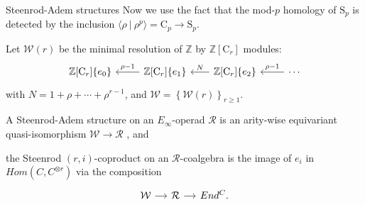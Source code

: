 \documentclass[10pt,t]{beamer}
\renewcommand{\S}{\mathrm{S}}
\newcommand{\C}{\mathrm{C}}
\begin{document}
\begin{frame}[fragile]{Steenrod-Adem structures}
	Now we use the fact that the mod-$p$ homology of $\S_p$ is detected by the inclusion $\langle \rho\ |\ \rho^p\rangle = \C_p \to \S_p$.
	
	\pause \vspace*{10pt}
	
	Let $\mathcal W(r)$ be the minimal resolution of $\mathbb{Z}$ by $\mathbb{Z}[\C_r]$ modules:
	\begin{equation*}
	\begin{tikzcd}[column sep=normal]
	\mathbb{Z}[\C_r]\{e_0\} & \arrow[l, "\rho-1"'] \mathbb{Z}[\C_r]\{e_1\} &[-5pt] \arrow[l, "N"']
	\mathbb{Z}[\C_r]\{e_2\} & \arrow[l, "\rho-1"'] \cdots
	\end{tikzcd}
	\end{equation*}
	with $N = 1+\rho+\cdots+\rho^{r-1}$, and $\mathcal{W} = \left\{\mathcal{W}(r)\right\}_{r \geq 1}$.
	
	\pause \vspace*{10pt}
	
	A \textcolor{pblue}{Steenrod-Adem structure} on an $E_\infty$-operad $\mathcal R$ is an arity-wise equivariant quasi-isomorphism $\mathcal W \to \mathcal R$ \pause, and
	
	\vspace*{10pt}
	
	the \textcolor{pblue}{Steenrod $(r, i)$-coproduct} on an $\mathcal R$-coalgebra is the image
	of $e_i$ in $Hom(C, C^{\otimes r})$ via the composition	
	\begin{equation*}
	\begin{tikzcd}[column sep=small]
	\mathcal W \arrow[r] & \mathcal R \arrow[r] & End^C.
	\end{tikzcd}
	\end{equation*}		
\end{frame}
\end{document}
